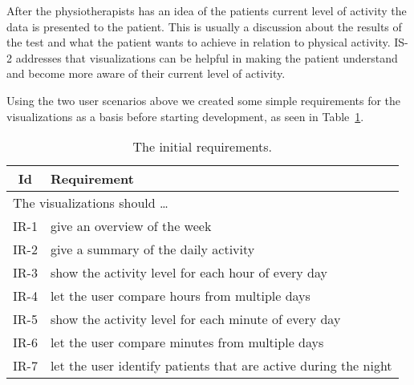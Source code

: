 After the physiotherapists has an idea of the patients current level of activity the data is presented to the patient. This is usually a discussion about the results of the test and what the patient wants to achieve in relation to physical activity. IS-2 addresses that visualizations can be helpful in making the patient understand and become more aware of their current level of activity.

Using the two user scenarios above we created some simple requirements for the visualizations as a basis before starting development, as seen in Table~\ref{tab:initialRequirements1}.

\clearpage

\begin{table}[t]
  \begin{center}
  \begin{tabular}{|c|p{12cm}|}
    \hline
      \textbf{Id} & \textbf{Requirement} \\ \hline
    \multicolumn{2}{|l|}{The visualizations should \ldots} \\ \hline
      IR-1 & give an overview of the week \\ \hline
      IR-2 & give a summary of the daily activity \\ \hline
      IR-3 & show the activity level for each hour of every day \\ \hline
      IR-4 & let the user compare hours from multiple days \\ \hline
      IR-5 & show the activity level for each minute of every day \\ \hline
      IR-6 & let the user compare minutes from multiple days \\ \hline
      IR-7 & let the user identify patients that are active during the night \\ \hline
  \end{tabular}
  \end{center}
  \caption[Initial requirements]{The initial requirements.}
  \label{tab:initialRequirements1}
\end{table}
